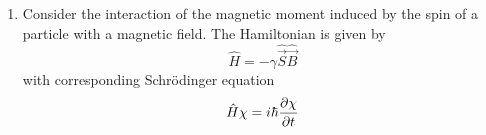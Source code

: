 \documentclass[../psets.tex]{subfiles}
\begin{document}
\begin{enumerate}
\begin{enumerate}
\begin{proof}
\begin{align*}
                1-\sin^2(\theta_s)\cdot 1+\sin^4(\theta_s)\cos^2(\alpha-\beta)\sin^2(\alpha-\beta) &\stackrel{?}{\geq} \cos^2(\theta_s)\\
                [1-\sin^2(\theta_s)]+\sin^4(\theta_s)\cos^2(\alpha-\beta)\sin^2(\alpha-\beta) &\stackrel{?}{\geq} \cos^2(\theta_s)\\
                \cos^2(\theta_s)+\sin^4(\theta_s)\cos^2(\alpha-\beta)\sin^2(\alpha-\beta) &\stackrel{?}{\geq} \cos^2(\theta_s)\\
                \sin^4(\theta_s)\cos^2(\alpha-\beta)\sin^2(\alpha-\beta) &\stackrel{?}{\geq} 0\\
                [\sin^2(\theta_s)\cos(\alpha-\beta)\sin(\alpha-\beta)]^2 &\stackrel{\checkmark}{\geq} 0
            \end{align*}
        \end{proof}
        \item What are the results of part (d) if you take an eigenstate of $\hat{S}_z$ with eigenvalue $\hbar/2$ ($\theta_s=\alpha=0$)?
        \begin{proof}
            Using the coordinate changes in the hint for part (e), we know that $\theta_s=\alpha=0$ implies that
            \begin{align*}
                c_+ &= \cos(\frac{0}{2})\e[i\cdot 0] = 1&
                c_- &= \sin(\frac{0}{2})\e[i\cdot\beta] = 0
            \end{align*}
            Thus, substituting into the results from part (d) and algebraically simplifying, we obtain
            \begin{align*}
                \Aboxed{\ev{\hat{S}_z}{\chi} &= \frac{\hbar}{2}}&
                \Aboxed{\ev{\hat{S}_x}{\chi} &= 0}&
                \Aboxed{\ev{\hat{S}_y}{\chi} &= 0}
            \end{align*}
        \end{proof}
    \end{enumerate}
    \item Consider the interaction of the magnetic moment induced by the spin of a particle with a magnetic field. The Hamiltonian is given by
    \begin{equation}
        \hat{H} = -\gamma\hat{\vec{S}}\hat{\vec{B}}
    \end{equation}
    with corresponding Schr\"{o}dinger equation
    \begin{equation}
        \hat{H}\chi = i\hbar\pdv{\chi}{t}
    \end{equation}
    \begin{enumerate}

\end{enumerate}
\end{enumerate}
\end{document}

